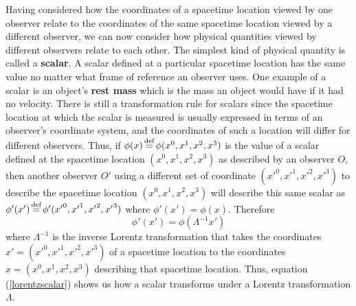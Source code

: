 Having considered how the coordinates of a spacetime location viewed by one observer relate to the coordinates of the same spacetime location viewed by a different observer, we can now consider how physical quantities viewed by different observers relate to each other. The simplest kind of physical quantity is called a \textbf{scalar}. A scalar defined at a particular spacetime location has the same value no matter what frame of reference an observer uses. One example of a scalar is an object's \textbf{rest mass} which is the mass an object would have if it had no velocity. There is still a transformation rule for scalars since the spacetime location at which the scalar is measured is usually expressed in terms of an observer's coordinate system, and the coordinates of  such a location  will differ for different observers. Thus, if $\phi(x)\myeq\phi(x^0, x^1, x^2, x^3)$ is the value of a scalar defined at the spacetime location $(x^0, x^1, x^2, x^3)$ as described by an observer $O$, then another observer $O'$ using a different set of coordinate $({x'}^0, {x'}^1, {x'}^2, {x'}^3)$ to describe the spacetime location $(x^0, x^1, x^2, x^3)$ will describe this same scalar as $\phi'(x')\myeq\phi'({x'}^0, {x'}^1, {x'}^2, {x'}^3)$  where $\phi'(x')=\phi(x)$. Therefore
\begin{equation}\label{lorentzscalar}
\phi'(x')=\phi(\Lambda^{-1}x')
\end{equation} 
where $\Lambda^{-1}$ is the inverse Lorentz transformation that takes the coordinates $x'=({x'}^0, {x'}^1, {x'}^2, {x'}^3)$ of a spacetime location to the coordinates $x=(x^0, x^1, x^2, x^3)$ describing that spacetime location. Thus, equation (\ref{lorentzscalar}) shows us how a scalar transforms under a Lorentz transformation $\Lambda$. 

